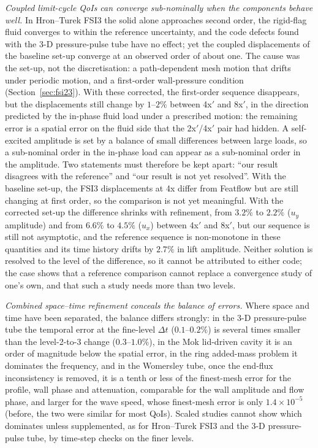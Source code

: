 \emph{Coupled limit-cycle QoIs can converge sub-nominally when the components behave well.}
In Hron--Turek FSI3 the solid alone approaches second order, the rigid-flag fluid converges to within the reference uncertainty, and the code defects found with the 3-D pressure-pulse tube have no effect; yet the coupled displacements of the baseline set-up converge at an observed order of about one. The cause was the set-up, not the discretisation: a path-dependent mesh motion that drifts under periodic motion, and a first-order wall-pressure condition (Section~\ref{sec:fsi23}). With these corrected, the first-order sequence disappears, but the displacements still change by $1$--$2\%$ between 4x$'$ and 8x$'$, in the direction predicted by the in-phase fluid load under a prescribed motion: the remaining error is a spatial error on the fluid side that the 2x$'$/4x$'$ pair had hidden.
A self-excited amplitude is set by a balance of small differences between large loads, so a sub-nominal order in the in-phase load can appear as a sub-nominal order in the amplitude.
Two statements must therefore be kept apart: ``our result disagrees with the reference'' and ``our result is not yet resolved''.
With the baseline set-up, the FSI3 displacements at 4x differ from Featflow but are still changing at first order, so the comparison is not yet meaningful. With the corrected set-up the difference shrinks with refinement, from $3.2\%$ to $2.2\%$ ($u_y$ amplitude) and from $6.6\%$ to $4.5\%$ ($u_x$) between 4x$'$ and 8x$'$, but our sequence is still not asymptotic, and the reference sequence is non-monotone in these quantities and its time history drifts by $2.7\%$ in lift amplitude. Neither solution is resolved to the level of the difference, so it cannot be attributed to either code; the case shows that a reference comparison cannot replace a convergence study of one's own, and that such a study needs more than two levels.

\emph{Combined space--time refinement conceals the balance of errors.}
Where space and time have been separated, the balance differs strongly: in the 3-D pressure-pulse tube the temporal error at the fine-level $\Delta t$ ($0.1$--$0.2\%$) is several times smaller than the level-2-to-3 change ($0.3$--$1.0\%$), in the Mok lid-driven cavity it is an order of magnitude below the spatial error, in the ring added-mass problem it dominates the frequency, and in the Womersley tube, once the end-flux inconsistency is removed, it is a tenth or less of the finest-mesh error for the profile, wall phase and attenuation, comparable for the wall amplitude and flow phase, and larger for the wave speed, whose finest-mesh error is only $1.4\times10^{-5}$ (before, the two were similar for most QoIs).
Scaled studies cannot show which dominates unless supplemented, as for Hron--Turek FSI3 and the 3-D pressure-pulse tube, by time-step checks on the finer levels.

